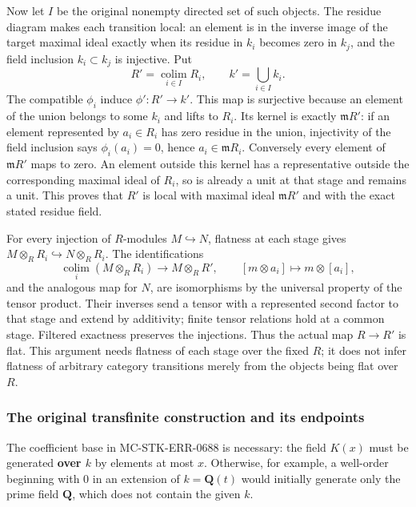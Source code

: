 Now let \(I\) be the original nonempty directed set of such objects. The residue diagram makes each transition local: an element is in the inverse image of the target maximal ideal exactly when its residue in \(k_i\) becomes zero in \(k_j\), and the field inclusion \(k_i\subset k_j\) is injective. Put \[
 R'=\operatorname*{colim}_{i\in I}R_i,\qquad k'=\bigcup_{i\in I}k_i.
\] The compatible \(\phi_i\) induce \(\phi':R'\to k'\). This map is surjective because an element of the union belongs to some \(k_i\) and lifts to \(R_i\). Its kernel is exactly \(\mathfrak mR'\): if an element represented by \(a_i\in R_i\) has zero residue in the union, injectivity of the field inclusion says \(\phi_i(a_i)=0\), hence \(a_i\in\mathfrak mR_i\). Conversely every element of \(\mathfrak mR'\) maps to zero. An element outside this kernel has a representative outside the corresponding maximal ideal of \(R_i\), so is already a unit at that stage and remains a unit. This proves that \(R'\) is local with maximal ideal \(\mathfrak mR'\) and with the exact stated residue field.

For every injection of \(R\)-modules \(M\hookrightarrow N\), flatness at each stage gives \(M\otimes_R R_i\hookrightarrow N\otimes_R R_i\). The identifications \[
 \operatorname*{colim}_i(M\otimes_R R_i)\longrightarrow
 M\otimes_R R',\qquad [m\otimes a_i]\longmapsto m\otimes[a_i],
\] and the analogous map for \(N\), are isomorphisms by the universal property of the tensor product. Their inverses send a tensor with a represented second factor to that stage and extend by additivity; finite tensor relations hold at a common stage. Filtered exactness preserves the injections. Thus the actual map \(R\to R'\) is flat. This argument needs flatness of each stage over the fixed \(R\); it does not infer flatness of arbitrary category transitions merely from the objects being flat over \(R\).

\subsubsection{The original transfinite construction and its endpoints}\label{the-original-transfinite-construction-and-its-endpoints}

The coefficient base in MC-STK-ERR-0688 is necessary: the field \(K(x)\) must be generated \textbf{over \(k\)} by elements at most \(x\). Otherwise, for example, a well-order beginning with \(0\) in an extension of \(k=\mathbf Q(t)\) would initially generate only the prime field \(\mathbf Q\), which does not contain the given \(k\).

